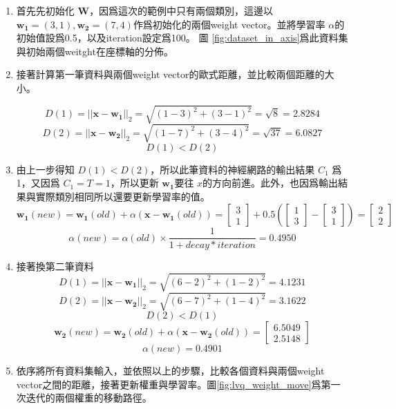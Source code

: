 \newpage
\begin{enumerate}
	\item
	      首先先初始化 \(\mathbf{W}\)，因爲這次的範例中只有兩個類別，這邊以 \(\mathbf{w_1}=(3,1),\mathbf{w_2}=(7,4)\)作爲初始化的兩個weight vector。並將學習率 \(\alpha\)的初始值設爲0.5，以及iteration設定爲100。
	      圖 \ref{fig:dataset_in_axis}爲此資料集與初始兩個weitght在座標軸的分佈。
	\item
	      接著計算第一筆資料與兩個weight vector的歐式距離，並比較兩個距離的大小。

	      $$D(1)=||\mathbf{x}-\mathbf{w_1}||_2 = \sqrt{(1-3)^2+(3-1)^2}=\sqrt{8}=2.8284 $$
	      $$D(2)=||\mathbf{x}-\mathbf{w_2}||_2 = \sqrt{(1-7)^2+(3-4)^2}=\sqrt{37}=6.0827 $$
	      $$D(1)<D(2)$$

	\item
	      由上一步得知 \(D(1)<D(2)\)，所以此筆資料的神經網路的輸出結果 \(C_1\) 爲1，又因爲 \(C_1 = T = 1\)，所以更新 \(\mathbf{w_1}\)要往 \(x\)的方向前進。此外，也因爲輸出結果與實際類別相同所以還要更新學習率的值。
	      $$\mathbf{w_1}(new) = \mathbf{w_1}(old) + \alpha(\mathbf{x-w_1}(old))= \begin{bmatrix}3\\ 1\end{bmatrix}+0.5(\begin{bmatrix}1\\ 3\end{bmatrix} - \begin{bmatrix}3\\ 1\end{bmatrix})= \begin{bmatrix}2\\ 2\end{bmatrix}  $$
	      $$\alpha(new) = \alpha(old)\times \frac{1}{1+decay*iteration} =0.4950$$

	\item
	      接著換第二筆資料
	      $$D(1)=||\mathbf{x}-\mathbf{w_1}||_2 = \sqrt{(6-2)^2+(1-2)^2}=4.1231 $$
	      $$D(2)=||\mathbf{x}-\mathbf{w_2}||_2 = \sqrt{(6-7)^2+(1-4)^2}=3.1622 $$
	      $$D(2)<D(1)$$
	      $$\mathbf{w_2}(new) = \mathbf{w_2}(old) + \alpha(\mathbf{x-w_2}(old))= \begin{bmatrix} 6.5049 \\ 2.5148 \end{bmatrix}  $$
	      $$\alpha(new) = 0.4901$$




	\item
		依序將所有資料集輸入，並依照以上的步驟，比較各個資料與兩個weight vector之間的距離，接著更新權重與學習率。圖\ref{fig:lvq_weight_move}爲第一次迭代的兩個權重的移動路徑。


\end{enumerate}
